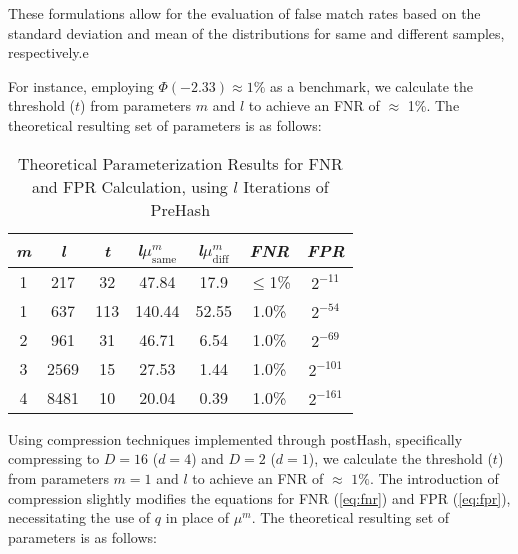 
These formulations allow for the evaluation of false match rates based on the standard deviation and mean of the distributions for same and different samples, respectively.e

For instance, employing \(\Phi(-2.33) \approx 1\%\) as a benchmark, we calculate the threshold (\(t\)) from parameters \(m\) and \(l\) to achieve an FNR of \(\approx\) 1\%. The theoretical resulting set of parameters is as follows: 

\begin{table}[htbp] 
    \centering
    \begin{tabular}{|c|c|c|c|c|c|c|}
        \hline
        \textit{m} & \textit{l} & \textit{t} & \textit{l}\(\mu_{\text{same}}^m\) & \textit{l}\(\mu_{\text{diff}}^m\) & \textit{FNR} & \textit{FPR} \\
        \hline
        1 & 217 & 32 & 47.84 & 17.9 & \(\leq\)1\% & \(2^{-11}\)\\
        1 & 637 & 113 & 140.44 & 52.55 & 1.0\% & \(2^{-54}\) \\
        2 & 961 & 31 & 46.71 & 6.54 & 1.0\% & \(2^{-69}\) \\
        3 & 2569 & 15 & 27.53 & 1.44 & 1.0\% &\(2^{-101}\) \\
        4 & 8481 & 10 & 20.04 & 0.39 & 1.0\% & \(2^{-161}\) \\
        \hline
    \end{tabular}
    \caption{Theoretical Parameterization Results for FNR and FPR Calculation, using $l$ Iterations of PreHash}
    \label{tab:theoretical_parameterization_PreHash}
\end{table}

Using compression techniques implemented through postHash, specifically compressing to \( D = 16 \) (\( d = 4 \)) and \( D = 2 \) (\( d = 1 \)), we calculate the threshold (\( t \)) from parameters \( m = 1 \) and \( l \) to achieve an FNR of \(\approx\) \(1\%\). The introduction of compression slightly modifies the equations for FNR (\ref{eq:fnr}) and FPR (\ref{eq:fpr}), necessitating the use of \( q \) in place of \(\mu^m\). The theoretical resulting set of parameters is as follows:

